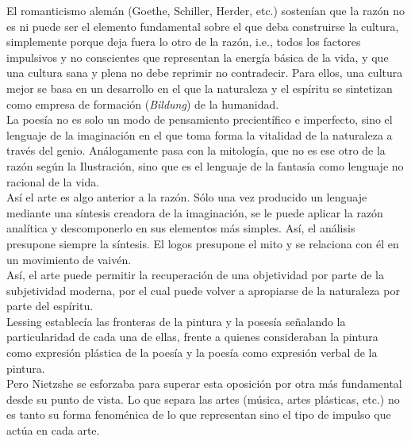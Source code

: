\documentclass[a4paper, 10pt, twocolumn, spanish]{article}
\begin{document}
El romanticismo alemán (Goethe, Schiller, Herder, etc.) sostenían que
la razón no es ni puede ser el elemento fundamental sobre el que deba
construirse la cultura, simplemente porque deja fuera lo otro de la
razón, i.e., todos los factores impulsivos y no conscientes que
representan la energía básica de la vida, y que una cultura sana y
plena no debe reprimir no contradecir. Para ellos, una cultura mejor
se basa en un desarrollo en el que la naturaleza y el espíritu se
sintetizan como empresa de formación (\emph{Bildung}) de la humanidad.\\[0pt]
La poesía no es solo un modo de pensamiento precientífico e
imperfecto, sino el lenguaje de la imaginación en el que toma forma la
vitalidad de la naturaleza a través del genio. Análogamente pasa con
la mitología, que no es ese otro de la razón según la Ilustración,
sino que es el lenguaje de la fantasía como lenguaje no racional de la
vida.\\[0pt]
Así el arte es algo anterior a la razón. Sólo una vez producido un
lenguaje mediante una síntesis creadora de la imaginación, se le puede
aplicar la razón analítica y descomponerlo en sus elementos más
simples. Así, el análisis presupone siempre la síntesis. El logos
presupone el mito y se relaciona con él en un movimiento de vaivén.\\[0pt]
Así, el arte puede permitir la recuperación de una objetividad por
parte de la subjetividad moderna, por el cual puede volver a
apropiarse de la naturaleza por parte del espíritu.\\[0pt]
Lessing establecía las fronteras de la pintura y la posesía señalando
la particularidad de cada una de ellas, frente a quienes consideraban
la pintura como expresión plástica de la poesía y la poesía como
expresión verbal de la pintura.\\[0pt]
Pero Nietzshe se esforzaba para superar esta oposición por otra más
fundamental desde su punto de vista. Lo que separa las artes (música,
artes plásticas, etc.) no es tanto su forma fenoménica de lo que
representan sino el tipo de impulso que actúa en cada arte.\\[0pt]
\end{document}
